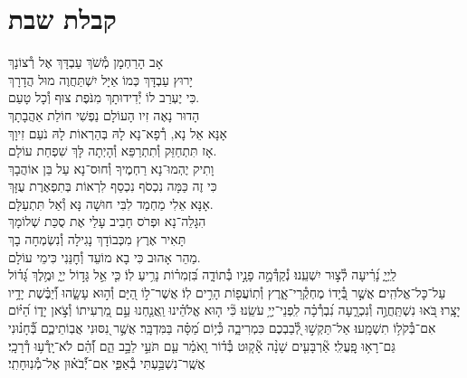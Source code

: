 \documentclass[twoside, openany, parskip=half, 11pt]{book}
\begin{document}
\chapter[קבלת שבת]{ קבלת שבת }
\label{kabalas_shabbos}

אָב הָרַחְמָן מְ֯שֹׁךְ עַבְדָּךְ אֶל רְ֯צוֹנָךְ\\
יָרוּץ עַבְדָּךְ כְּמוֹ אַיָּל יִשְׁתַּחֲוֶה מוּל הֲדָרָךְ\\
כִּי יֶעְרַב לוֹ יְ֯דִידוּתָךְ מִנֹּפֶת צוּף וְ֯כָל טָעַם.\\


הָדוּר נָאֶה זִיו הָעוֹלָם נַפְשִׁי חוֹלַת אַהֲבָתָךְ\\
אָנָּא אֵל נָא, רְ֯פָא־נָא לָהּ בְּהַרְאוֹת לָהּ נֹעַם זִיוָךְ\\
אָז תִּתְחַזֵּק וְ֯תִתְרַפֵּא וְ֯הָיְתָה לָּךְ שִׁפְחַת עוֹלָם.\\


וָתִיק יֶהְמוּ־נָא רַחְמֶיךָ וְ֯חוּס־נָא עַל בֵּן אוֹהֲבָךְ\\
כִּי זֶה כַּמָּה נִכְסֹף נִכְסַף לִרְאוֹת בְּתִפְאֶרֶת עֻזָּךְ\\
אָנָּא אֵלִי מַחְמַד לִבִּי חוּשָׁה נָּא וְ֯אַל תִּתְעַלָּם.\\

הִגָּלֵה־נָא וּפְרֹס חָבִיב עָלַי אֶת סֻכַּת שְׁלוֹמָךְ\\
תָּאִיר אֶרֶץ מִכְּבוֹדָךְ נָגִילָה וְ֯נִשְׂמְחָה בָךְ\\
מַהֵר אָהוּב כִּי בָא מוֹעֵד וְ֯חׇנֵּנִי כִּימֵי עוֹלָם.\\

לַֽיְיָ֑ נָ֝רִ֗יעָה לְ֯צ֣וּר יִשְׁעֵֽנוּ׃
נְ֯קַדְּ֯מָ֣ה פָנָ֣יו בְּ֯תוֹדָ֑ה בִּ֝זְמִר֗וֹת נָרִ֥יעַ לֽוֹ׃
כִּ֤י אֵ֣ל גָּד֣וֹל יְיָ֑ וּמֶ֥לֶךְ גָּ֝ד֗וֹל עַל־כׇּל־אֱלֹהִֽים׃
אֲשֶׁ֣ר בְּ֭֯יָדוֹ מֶחְקְ֯רֵי־אָ֑רֶץ וְ֯תֽוֹעֲפ֖וֹת הָרִ֣ים לֽוֹ׃
אֲשֶׁר־ל֣וֹ הַ֭יָּם וְ֯ה֣וּא עָשָׂ֑הוּ וְ֝֯יַבֶּ֗שֶׁת יָדָ֥יו יָצָֽרוּ׃
בֹּ֭אוּ נִשְׁתַּֽחֲוֶ֣ה וְ֯נִכְרָ֑עָה נִ֝בְרְ֯כָ֗ה לִֽפְנֵי־יְיָ֥ עֹשֵֽׂנוּ׃
כִּ֘י ה֤וּא אֱלֹהֵ֗ינוּ וַֽאֲנַ֤חְנוּ עַ֣ם מַ֭רְעִיתוֹ וְ֯צֹ֣אן יָד֑וֹ הַ֝יּ֗וֹם אִם־בְּ֯קֹל֥וֹ תִשְׁמָֽעוּ׃
אַל־תַּקְשׁ֣וּ לְ֭֯בַבְכֶם כִּמְרִיבָ֑ה כְּ֯י֥וֹם מַ֝סָּ֗ה בַּמִּדְבָּֽר׃
אֲשֶׁ֣ר נִ֭סּוּנִי אֲבֽוֹתֵיכֶ֑ם בְּ֝֯חָנ֗וּנִי גַּם־רָא֥וּ פׇֽעֳלִֽי׃
אַ֘רְבָּעִ֤ים שָׁנָ֨ה אָ֘ק֤וּט בְּ֯ד֗וֹר וָֽאֹמַ֗ר עַ֤ם תֹּעֵ֣י לֵבָ֣ב הֵ֑ם וְ֝֯הֵ֗ם לֹא־יָֽדְ֯ע֥וּ דְ֯רָכָֽי׃
אֲשֶֽׁר־נִשְׁבַּ֥עְתִּי בְ֯אַפִּ֑י אִם־יְ֝֯בֹא֗וּן אֶל־מְ֯נֽוּחָתִֽי׃
\end{document}
